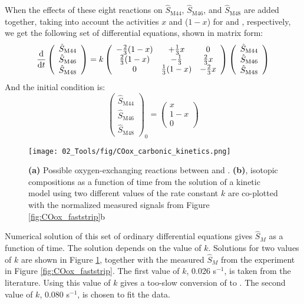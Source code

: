 When the effects of these eight reactions on $\hat{S}_\text{M44}$, $\hat{S}_\text{M46}$, and $\hat{S}_\text{M48}$ are added together, taking into account the activities $x$ and ($1-x$) for  and , respectively, we get the following set of differential equations, shown in matrix form:
\begin{equation}
\frac{\mathrm{d}}{\mathrm{d} t} \left( \begin{array}{c}  \hat{S}_\text{M44} \\ \hat{S}_\text{M46}\\ \hat{S}_\text{M48} 
\end{array}  \right) = k \left( \begin{array}{c c c}   -\frac{2}{3}(1-x) & + \frac{1}{3}x & 0 \\  \frac{2}{3}(1-x) & -\frac{1}{3} & \frac{2}{3}x \\  0 & \frac{1}{3}(1-x) & -\frac{2}{3}x
\end{array}  \right) \left(\begin{array}{c}  \hat{S}_\text{M44} \\ \hat{S}_\text{M46}\\ \hat{S}_\text{M48} 
\end{array}  \right)
\end{equation}
And the initial condition is:
\begin{equation}
\left(\begin{array}{c}  \hat{S}_\text{M44} \\ \hat{S}_\text{M46}\\ \hat{S}_\text{M48} 
\end{array}  \right)_0 = \left(\begin{array}{c}  x \\ 1-x \\ 0 
\end{array}  \right)
\end{equation}
\begin{figure}[h!]
	\centering
	\texttt{[image: 02\_Tools/fig/COox\_carbonic\_kinetics.png]}
	\caption{\textbf{(a)} Possible oxygen-exchanging reactions between  and . \textbf{(b)},  isotopic compositions as a function of time from the solution of a kinetic model using two different values of the rate constant $k$ are co-plotted with the normalized measured  signals from Figure \ref{fig:COox_faststrip}b}
	\label{fig:carbonic_kinetics}
\end{figure}
Numerical solution of this set of ordinary differential equations gives $\hat{S}_M$ as a function of time. The solution depends on the value of $k$. Solutions for two values of $k$ are shown in Figure \ref{fig:carbonic_kinetics}, together with the measured $\hat{S}_M$ from the experiment in Figure \ref{fig:COox_faststrip}. The first value of $k$, 0.026 s$^{-1}$, is taken from the literature\cite{Pinsent1956}. Using this value of $k$ gives a too-slow conversion of  to . The second value of $k$, 0.080 s$^{-1}$, is chosen to fit the data. 


